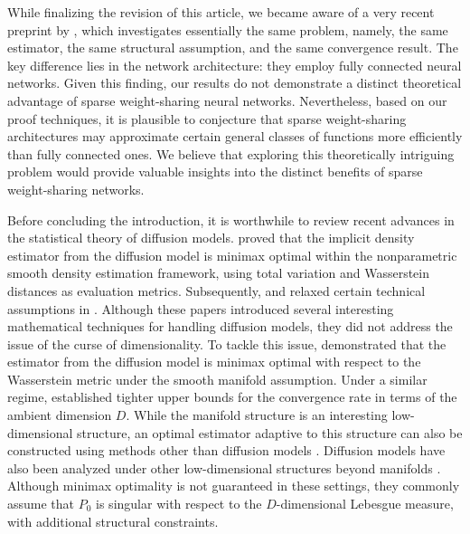 \documentclass[twoside,11pt]{article}
\begin{document}
While finalizing the revision of this article, we became aware of a very recent preprint by \citet{fan2025optimal}, which investigates essentially the same problem, namely, the same estimator, the same structural assumption, and the same convergence result. The key difference lies in the network architecture: they employ fully connected neural networks. Given this finding, our results do not demonstrate a distinct theoretical advantage of sparse weight-sharing neural networks. Nevertheless, based on our proof techniques, it is plausible to conjecture that sparse weight-sharing architectures may approximate certain general classes of functions more efficiently than fully connected ones. We believe that exploring this theoretically intriguing problem would provide valuable insights into the distinct benefits of sparse weight-sharing networks.

Before concluding the introduction, it is worthwhile to review recent advances in the statistical theory of diffusion models.
\citet{oko2023diffusion} proved that the implicit density estimator from the diffusion model is minimax optimal within the nonparametric smooth density estimation framework, using total variation and Wasserstein distances as evaluation metrics.
Subsequently, \citet{zhang2024minimax} and \citet{wibisono2024} relaxed certain technical assumptions in \citet{oko2023diffusion}.
Although these papers introduced several interesting mathematical techniques for handling diffusion models, they did not address the issue of the curse of dimensionality.
To tackle this issue, \citet{tang2024adaptivity} demonstrated that the estimator from the diffusion model is minimax optimal with respect to the Wasserstein metric under the smooth manifold assumption.
Under a similar regime, \citet{azangulov2024convergence} established tighter upper bounds for the convergence rate in terms of the ambient dimension $D$.
While the manifold structure is an interesting low-dimensional structure, an optimal estimator adaptive to this structure can also be constructed using methods other than diffusion models \citep{tang2023minimax, stephanovitch2024wasserstein}.
Diffusion models have also been analyzed under other low-dimensional structures beyond manifolds \citep{chen2023score, wang2024diffusion, yakovlev2025generalization}. 
Although minimax optimality is not guaranteed in these settings, they commonly assume that $P_{0}$ is singular with respect to the $D$-dimensional Lebesgue measure, with additional structural constraints.
\end{document}
